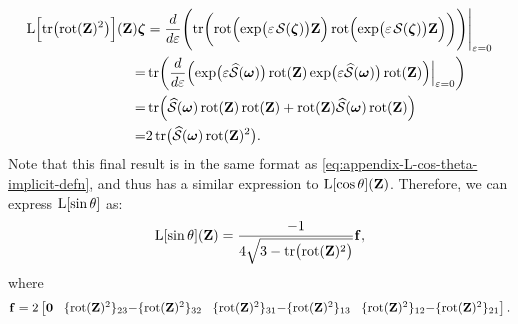 \begin{align}
    \Lop\Bigl[\tr\bigl(\rot(\mathbf{Z})^2\bigr)\Bigr](\mathbf{Z})\boldsymbol{\zeta} &= \frac{d}{d\varepsilon}\Biggl(\tr\biggl(\rot\Bigl(\exp\bigl(\varepsilon\SL[\boldsymbol{\zeta}]\bigr)\mathbf{Z}\Bigr)\rot\Bigl(\exp\bigl(\varepsilon\SL[\boldsymbol{\zeta}]\bigr)\mathbf{Z}\Bigr)\biggr)\Biggr)\Biggr|_{\varepsilon=0}\\
    =&\tr\biggl(\frac{d}{d\varepsilon}\Bigl(\exp\bigl(\varepsilon\widehat{\mathcal{S}}(\boldsymbol{\omega})\bigr)\rot(\mathbf{Z})\exp\bigl(\varepsilon\widehat{\mathcal{S}}(\boldsymbol{\omega})\bigr)\rot(\mathbf{Z})\Bigr)\Bigr|_{\varepsilon=0}\biggr)\\
    =&\tr\Bigl(\widehat{\mathcal{S}}(\boldsymbol{\omega})\rot(\mathbf{Z})\rot(\mathbf{Z})
    +\rot(\mathbf{Z})\widehat{\mathcal{S}}(\boldsymbol{\omega})\rot(\mathbf{Z})
    \Bigr)\\
    =& 2\tr\bigl(\widehat{\mathcal{S}}(\boldsymbol{\omega})\rot(\mathbf{Z})^2\bigr).
\end{align}
Note that this final result is in the same format as \eqref{eq:appendix-L-cos-theta-implicit-defn}, and thus has a similar expression to $\operatorname{L}[\cos\theta](\mathbf{Z})$. Therefore, we can express $\operatorname{L}[\sin\theta]$ as:
\begin{align}
    \operatorname{L}[\sin\theta](\mathbf{Z}) = \frac{-1}{4\sqrt{3 - \operatorname{tr}\bigl(\operatorname{rot}(\mathbf{Z})^2\bigr)}}\mathbf{f},
\end{align}
where 
\begin{align*}
    \mathbf{f} = 2\begin{bmatrix}
        \mathbf{0}& \!\{\operatorname{rot}(\mathbf{Z})^2\}_{23} {-} \{\operatorname{rot}(\mathbf{Z})^2\}_{32} & \!\{\operatorname{rot}(\mathbf{Z})^2\}_{31} {-} \{\operatorname{rot}(\mathbf{Z})^2\}_{13} & \!\{\operatorname{rot}(\mathbf{Z})^2\}_{12} {-} \{\operatorname{rot}(\mathbf{Z})^2\}_{21}
    \end{bmatrix}.
\end{align*}

